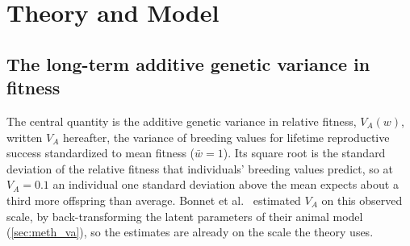 \documentclass{article}
\begin{document}
    \linenumbers
\fi


\section{Theory and Model}
\subsection{The long-term additive genetic variance in fitness}\label{sec:quantity}
The central quantity is the additive genetic variance in relative fitness, $V_A(w)$, written $V_A$ hereafter, the variance of breeding values for lifetime reproductive success standardized to mean fitness ($\bar{w} = 1$). Its square root is the standard deviation of the relative fitness that individuals' breeding values predict, so at $V_A = 0.1$ an individual one standard deviation above the mean expects about a third more offspring than average. Bonnet et al.~\cite{bonnet2022} estimated $V_A$ on this observed scale, by back-transforming the latent parameters of their animal model (\autoref{sec:meth_va}), so the estimates are already on the scale the theory uses.
\end{document}
